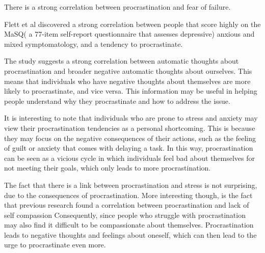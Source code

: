 


There is a strong correlation between procrastination and fear of failure. \cite{Flett2012Dec}

Flett et al \cite{Flett2012Dec} discovered a strong correlation between people that score highly on the MaSQ(
a 77-item self-report questionnaire that assesses depressive) anxious and mixed symptomatology, and a tendency to procrastinate.

The study suggests a strong correlation between automatic thoughts about procrastination and broader negative automatic thoughts about ourselves. This means that individuals who have negative thoughts about themselves are more likely to procrastinate, and vice versa. This information may be useful in helping people understand why they procrastinate and how to address the issue.

It is interesting to note that individuals who are prone to stress and anxiety may view their procrastination tendencies as a personal shortcoming. This is because they may focus on the negative consequences of their actions, such as the feeling of guilt or anxiety that comes with delaying a task. In this way, procrastination can be seen as a vicious cycle in which individuals feel bad about themselves for not meeting their goals, which only leads to more procrastination.


\cite{Flett2012Dec}

The fact that there is a link between procrastination and stress \cite{Sirois2013Feb} is not surprising, due to the consequences of procrastination. More interesting though, is the fact that previous research found a correlation between procrastination and lack of self compassion \cite{Sirois2013Feb}
Consequently, since people who struggle with procrastination may also find
it difficult to be compassionate about themselves. Procrastination leads to negative thoughts and feelings about oneself, which can then lead to the urge to procrastinate even more.

